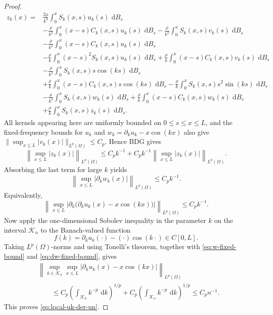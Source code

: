\documentclass[11pt]{article}
\newcommand{\dd}{\,\mathrm d}
\begin{document}
\begin{proof}
\[
\begin{aligned}
 z_k(x)={}&\frac{2\rho}{k^3}\int_0^x S_k(x,s)u_k(s)\,\dd B_s \\
&-\frac{\rho}{k^2}\int_0^x (x-s)C_k(x,s)u_k(s)\,\dd B_s
 -\frac{\rho}{k^2}\int_0^x S_k(x,s)v_k(s)\,\dd B_s \\
&-\frac{\rho}{k^2}\int_0^x (x-s)C_k(x,s)u_k(s)\,\dd B_s \\
&-\frac{\rho}{k}\int_0^x (x-s)^2S_k(x,s)u_k(s)\,\dd B_s
 +\frac{\rho}{k}\int_0^x (x-s)C_k(x,s)v_k(s)\,\dd B_s \\
&-\frac{\rho}{k^2}\int_0^x S_k(x,s)s\cos(ks)\,\dd B_s \\
&+\frac{\rho}{k}\int_0^x (x-s)C_k(x,s)s\cos(ks)\,\dd B_s
 -\frac{\rho}{k}\int_0^x S_k(x,s)s^2\sin(ks)\,\dd B_s \\
&-\frac{\rho}{k^2}\int_0^x S_k(x,s)w_k(s)\,\dd B_s
 +\frac{\rho}{k}\int_0^x (x-s)C_k(x,s)w_k(s)\,\dd B_s \\
&+\frac{\rho}{k}\int_0^x S_k(x,s)z_k(s)\,\dd B_s .
\end{aligned}
\]
All kernels appearing here are uniformly bounded on $0\le s\le x\le L$, and the fixed-frequency bounds for $u_k$ and $w_k=\partial_k u_k-x\cos(kx)$ also give $\|\sup_{x\le L}|v_k(x)|\|_{L^p(\Omega)}\le C_p$. Hence BDG gives
\[
    \left\|\sup_{x\le L}|z_k(x)|\right\|_{L^p(\Omega)}
    \le C_pk^{-1}+C_pk^{-1}\left\|\sup_{x\le L}|z_k(x)|\right\|_{L^p(\Omega)}.
\]
Absorbing the last term for large $k$ yields
\begin{equation}\label{eq:dw-fixed-bound}
    \left\|\sup_{x\le L}|\partial_k w_k(x)|\right\|_{L^p(\Omega)}
    \le C_pk^{-1}.
\end{equation}
Equivalently,
\[
    \left\|\sup_{x\le L}\left|\partial_k\bigl(\partial_k u_k(x)-x\cos(kx)\bigr)\right|\right\|_{L^p(\Omega)}
    \le C_pk^{-1}.
\]
Now apply the one-dimensional Sobolev inequality in the parameter $k$ on the interval $\mathcal K_n$ to the Banach-valued function
\[
    f(k)=\partial_k u_k(\cdot)-(\cdot)\cos(k\cdot)\in C[0,L].
\]
Taking $L^p(\Omega)$-norms and using Tonelli's theorem, together with \eqref{eq:w-fixed-bound} and \eqref{eq:dw-fixed-bound}, gives
\[
\begin{aligned}
&\left\|\sup_{k\in\mathcal K_n}\sup_{x\le L}
|\partial_k u_k(x)-x\cos(kx)|\right\|_{L^p(\Omega)} \\
&\qquad\le C_p\left(\int_{\mathcal K_n} k^{-p}\,\dd k\right)^{1/p}
     +C_p\left(\int_{\mathcal K_n} k^{-p}\,\dd k\right)^{1/p}
\le C_p n^{-1}.
\end{aligned}
\]
This proves \eqref{eq:local-uk-der-un}.
\end{proof}
\end{document}
